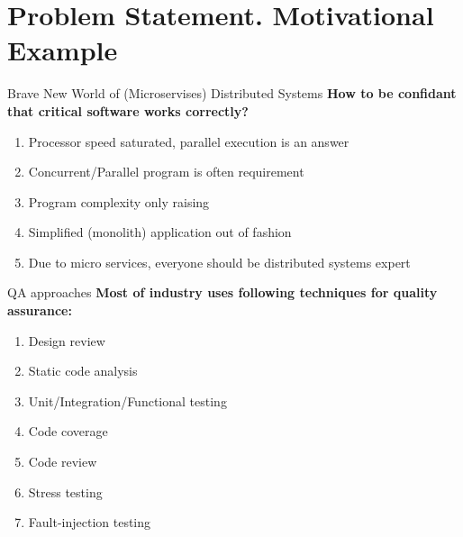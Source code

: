 \documentclass[12pt]{beamer}
\begin{document}
  \section{Problem Statement. Motivational Example}
  \begin{frame}{Brave New World of (Microservises) Distributed Systems}
      \textbf{How to be confidant that critical software works correctly?}
      \begin{enumerate}
          \item Processor speed saturated, parallel execution is an answer
          \item Concurrent/Parallel program is often requirement
          \item Program complexity only raising
          \item Simplified (monolith) application out of fashion
          \item Due to micro services, everyone should be distributed
              systems expert
      \end{enumerate}
  \end{frame}
  \begin{frame}{QA approaches}
      \textbf{Most of industry uses following techniques for quality
      assurance:}
      \begin{enumerate}
          \item Design review
          \item Static code analysis
          \item Unit/Integration/Functional testing
          \item Code coverage
          \item Code review
          \item Stress testing
          \item Fault-injection testing \cite{principlesofchaos}
      \end{enumerate}
  \end{frame}
\end{document}
